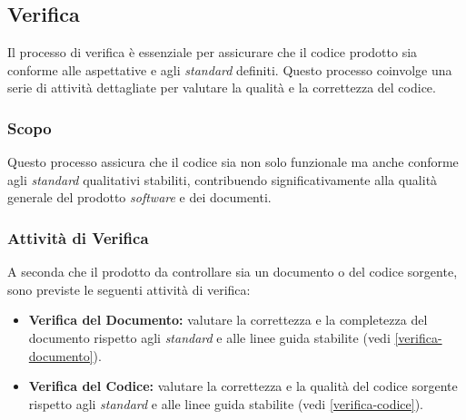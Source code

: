 \subsection{Verifica}

Il processo di verifica è essenziale per assicurare che il codice prodotto sia
conforme alle aspettative e agli \textit{standard} definiti. Questo processo coinvolge
una serie di attività dettagliate per valutare la qualità e la correttezza del
codice.

\subsubsection{Scopo}
Questo processo assicura che il codice sia non solo funzionale ma anche
conforme agli \textit{standard} qualitativi stabiliti, contribuendo significativamente
alla qualità generale del prodotto \textit{software} e dei documenti.

\subsubsection{Attività di Verifica}
A seconda che il prodotto da controllare sia un documento o del codice sorgente,
sono previste le seguenti attività di verifica:
\begin{itemize}
	\item \textbf{Verifica del Documento:} valutare la correttezza e la
	      completezza del documento rispetto agli \textit{standard} e alle linee guida
	      stabilite (vedi \cref{verifica-documento}).

	\item \textbf{Verifica del Codice:} valutare la correttezza e la qualità del
	      codice sorgente rispetto agli \textit{standard} e alle linee guida stabilite
	      (vedi \cref{verifica-codice}).
\end{itemize}
